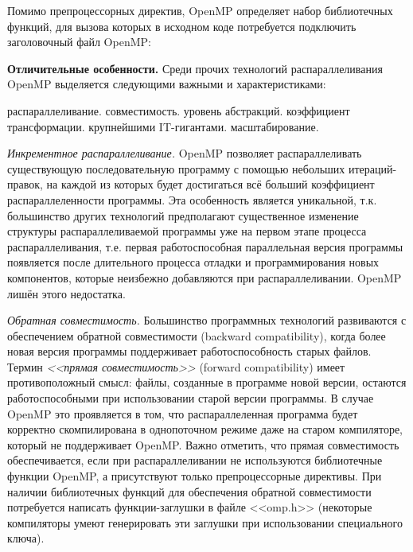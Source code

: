 Помимо препроцессорных директив, OpenMP определяет набор библиотечных функций, для вызова которых в исходном коде потребуется подключить заголовочный файл OpenMP:

\textbf{Отличительные особенности.} Среди прочих технологий распараллеливания OpenMP выделяется следующими важными и характеристиками:

\begin{itemize}
     распараллеливание.
     совместимость.
     уровень абстракций.
     коэффициент трансформации.
     крупнейшими IT-гигантами. 
     масштабирование.
\end{itemize}

\textit{Инкрементное распараллеливание.}  OpenMP позволяет распараллеливать существующую последовательную программу с помощью небольших итераций-правок, на каждой из которых будет достигаться всё больший коэффициент распараллеленности программы. Эта особенность является уникальной, т.к. большинство других технологий предполагают существенное изменение структуры распараллеливаемой программы уже на первом этапе процесса распараллеливания, т.е. первая работоспособная параллельная версия программы появляется после длительного процесса отладки и программирования новых компонентов, которые неизбежно добавляются при распараллеливании. OpenMP лишён этого недостатка.

\textit{Обратная совместимость.} Большинство программных технологий развиваются с обеспечением обратной совместимости (back\-ward com\-pat\-i\-bil\-i\-ty), когда более новая версия программы поддерживает работоспособность старых файлов. Термин \textit{<<прямая совместимость>>} (forward compatibility) имеет противоположный смысл: файлы, созданные в программе новой версии, остаются работоспособными при использовании старой версии программы. В случае OpenMP это проявляется в том, что распараллеленная программа будет корректно скомпилирована в однопоточном режиме даже на старом компиляторе, который не поддерживает OpenMP. Важно отметить, что прямая совместимость обеспечивается, если при распараллеливании не используются библиотечные функции OpenMP, а присутствуют только препроцессорные директивы. При наличии библиотечных функций для обеспечения обратной совместимости потребуется написать функции-заглушки в файле <<omp.h>> (некоторые компиляторы умеют генерировать эти заглушки при использовании специального ключа).


